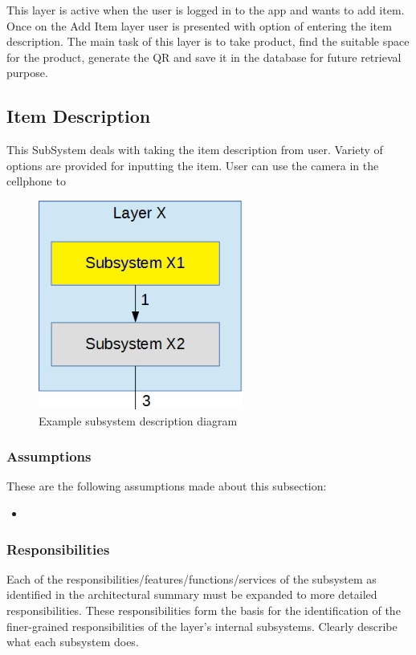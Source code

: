 This layer is active when the user is logged in to the app and wants to add item. Once on the Add Item layer user is presented with option of entering the item description. The main task of this layer is to take product, find the suitable space for the product, generate the QR and save it in the database for future retrieval purpose.
\subsection{Item Description}
This SubSystem deals with taking the item description from user. Variety of options are provided for inputting the item. User can use the camera in the cellphone to 

\begin{figure}[h!]
	\centering
 	\includegraphics[width=0.60\textwidth]{images/subsystem}
 \caption{Example subsystem description diagram}
\end{figure}

\subsubsection{Assumptions}
These are the following assumptions made about this subsection:
\begin{itemize}
    \item 
\end{itemize}

\subsubsection{Responsibilities}
Each of the responsibilities/features/functions/services of the subsystem as identified in the architectural summary must be expanded to more detailed responsibilities. These responsibilities form the basis for the identification of the finer-grained responsibilities of the layer's internal subsystems. Clearly describe what each subsystem does.

